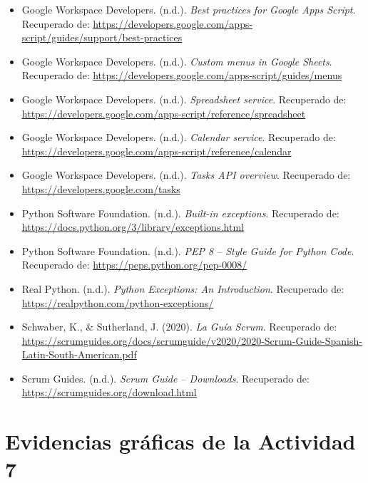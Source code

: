 \documentclass[12pt]{article}
\begin{document}
\begin{itemize}
    \item Google Workspace Developers. (n.d.). \textit{Best practices for Google Apps Script}.  
    Recuperado de: \url{https://developers.google.com/apps-script/guides/support/best-practices}

    \item Google Workspace Developers. (n.d.). \textit{Custom menus in Google Sheets}.  
    Recuperado de: \url{https://developers.google.com/apps-script/guides/menus}

    \item Google Workspace Developers. (n.d.). \textit{Spreadsheet service}.  
    Recuperado de: \url{https://developers.google.com/apps-script/reference/spreadsheet}

    \item Google Workspace Developers. (n.d.). \textit{Calendar service}.  
    Recuperado de: \url{https://developers.google.com/apps-script/reference/calendar}

    \item Google Workspace Developers. (n.d.). \textit{Tasks API overview}.  
    Recuperado de: \url{https://developers.google.com/tasks}

    \item Python Software Foundation. (n.d.). \textit{Built-in exceptions}.  
    Recuperado de: \url{https://docs.python.org/3/library/exceptions.html}

    \item Python Software Foundation. (n.d.). \textit{PEP 8 -- Style Guide for Python Code}.  
    Recuperado de: \url{https://peps.python.org/pep-0008/}

    \item Real Python. (n.d.). \textit{Python Exceptions: An Introduction}.  
    Recuperado de: \url{https://realpython.com/python-exceptions/}

    \item Schwaber, K., \& Sutherland, J. (2020). \textit{La Guía Scrum}.  
    Recuperado de: \url{https://scrumguides.org/docs/scrumguide/v2020/2020-Scrum-Guide-Spanish-Latin-South-American.pdf}

    \item Scrum Guides. (n.d.). \textit{Scrum Guide – Downloads}.  
    Recuperado de: \url{https://scrumguides.org/download.html}

\end{itemize}


\appendix
\section{Evidencias gráficas de la Actividad 7}
\end{document}
